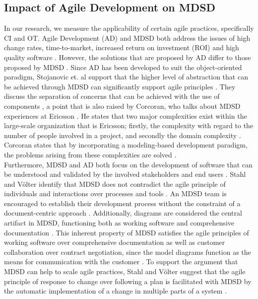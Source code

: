 \documentclass[fina_report_innit.tex]{subfiles}
\begin{document}
\subsection{Impact of Agile Development on MDSD}

In our research, we measure the applicability of certain agile practices, specifically CI and OT. Agile Development (AD) and MDSD both address the issues of high change rates, time-to-market, increased return on investment (ROI) and high quality software \cite{stojanovic2003component}. However, the solutions that are proposed by AD differ to those proposed by MDSD \cite{stojanovic2003component}. Since AD has been developed to suit the object-oriented paradigm, Stojanovic et. al support that the higher level of abstraction that can be achieved through MDSD can significantly support agile principles \cite{stojanovic2003component}. They discuss the separation of concerns that can be achieved with the use of components \cite{stojanovic2003component}, a point that is also raised by Corcoran, who talks about MDSD experiences at Ericsson \cite{selic2010modelling}. He states that two major complexities exist within the large-scale organization that is Ericsson; firstly, the complexity with regard to the number of people involved in a project, and secondly the domain complexity \cite{selic2010modelling}. Corcoran states that by incorporating a modeling-based development paradigm, the problems arising from these complexities are solved \cite{selic2010modelling}. 
\\

Furthermore, MDSD and AD both focus on the development of software that can be understood and validated by the involved stakeholders and end users \cite{stahl2006model}. Stahl and Völter identify that MDSD does not contradict the agile principle of individuals and interactions over processes and tools \cite{stahl2006model}. An MDSD team is encouraged to establish their development process without the constraint of a document-centric approach \cite{stahl2006model}. Additionally, diagrams are considered the central artifact in MDSD, functioning both as working software and comprehensive documentation \cite{stahl2006model}. This inherent property of MDSD satisfies the agile principles of working software over comprehensive documentation as well as customer collaboration over contract negotiation, since the model diagrams function as the means for communication with the customer \cite{stahl2006model}. To support the argument that MDSD can help to scale agile practices, Stahl and Völter suggest that the agile principle of response to change over following a plan is facilitated with MDSD by the automatic implementation of a change in multiple parts of a system \cite{stahl2006model}.
\end{document}
